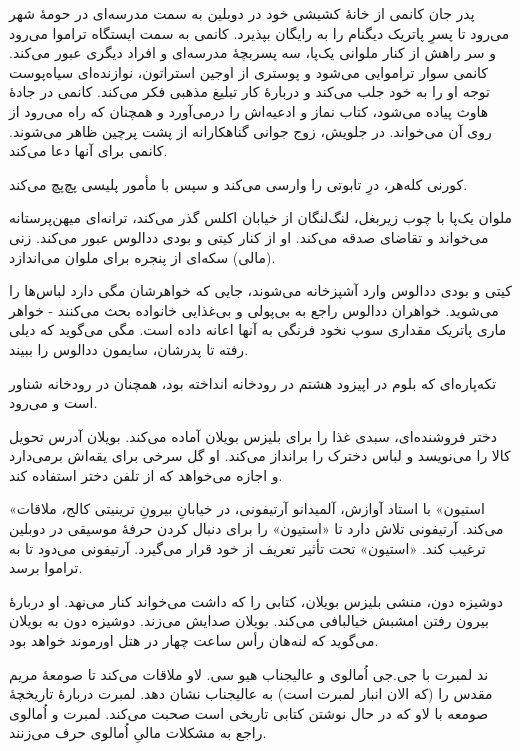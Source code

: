 \documentclass[12pt]{book}
\newcommand{\noun}[1]{«{#1}»}
\begin{document}
    پدر جان کانمی از خانۀ کشیشی خود در دوبلین به سمت مدرسه‌ای در حومۀ شهر می‌رود تا پسرِ پاتریک دیگنام را به رایگان بپذیرد. کانمی به سمت ایستگاه تراموا می‌رود و سر راهش از کنار ملوانی یک‌پا، سه پسربچۀ مدرسه‌ای و افراد دیگری عبور می‌کند. کانمی سوار تراموایی می‌شود و پوستری از اوجین استراتون، نوازنده‌ای سیاه‌پوست توجه او را به خود جلب می‌کند و دربارۀ کار تبلیغ مذهبی فکر می‌کند. کانمی در جادۀ هاوث پیاده می‌شود، کتاب نماز و ادعیه‌اش را درمی‌آورد و همچنان که راه می‌رود از روی آن می‌خواند. در جلویش، زوج جوانی گناهکارانه از پشت پرچین ظاهر می‌شوند. کانمی برای آنها دعا می‌کند.

    کورنی کله‌هر، درِ تابوتی را وارسی می‌کند و سپس با مأمور پلیسی پچ‌پچ می‌کند.

    ملوان یک‌پا با چوب زیربغل، لنگ‌لنگان از خیابان اکلس گذر می‌کند، ترانه‌ای میهن‌پرستانه می‌خواند و تقاضای صدقه می‌کند. او از کنار کیتی و بودی ددالوس عبور می‌کند. زنی (مالی) سکه‌ای از پنجره برای ملوان می‌اندازد.

    کیتی و بودی ددالوس وارد آشپزخانه می‌شوند، جایی که خواهرشان مگی دارد لباس‌ها را می‌شوید. خواهران ددالوس راجع به بی‌پولی و بی‌غذایی خانواده بحث می‌کنند - خواهر ماری پاتریک مقداری سوپ نخود فرنگی به آنها اعانه داده است. مگی می‌گوید که دیلی رفته تا پدرشان، سایمون ددالوس را ببیند.

    تکه‌پاره‌ای که بلوم در اپیزود هشتم در رودخانه انداخته بود، همچنان در رودخانه شناور است و می‌رود.

    دختر فروشنده‌ای، سبدی غذا را برای بلیزس بویلان آماده می‌کند. بویلان آدرس تحویل کالا را می‌نویسد و لباس دخترک را برانداز می‌کند. او گل سرخی برای یقه‌اش برمی‌دارد و اجازه می‌خواهد که از تلفن دختر استفاده کند.

    \noun{استیون} با استاد آوازش، آلمیدانو آرتیفونی، در خیابانِ بیرونِ ترینیتی کالج، ملاقات می‌کند. آرتیفونی تلاش دارد تا \noun{استیون} را برای دنبال کردن حرفۀ موسیقی در دوبلین ترغیب کند. \noun{استیون} تحت تأثیر تعریف از خود قرار می‌گیرد. آرتیفونی می‌دود تا به تراموا برسد.

    دوشیزه دون، منشی بلیزس بویلان، کتابی را که داشت می‌خواند کنار می‌نهد. او دربارۀ بیرون رفتن امشبش خیالبافی می‌کند. بویلان صدایش می‌زند. دوشیزه دون به بویلان می‌گوید که لنه‌هان رأس ساعت چهار در هتل اورموند خواهد بود.

    ند لمبرت با جی.جی اُمالوی و عالیجناب هیو سی. لاو ملاقات می‌کند تا صومعۀ مریم مقدس را (که الان انبار لمبرت است) به عالیجناب نشان دهد. لمبرت دربارۀ تاریخچۀ صومعه با لاو که در حال نوشتن کتابی تاریخی است صحبت می‌کند. لمبرت و اُمالوی راجع به مشکلات مالیِ اُمالوی حرف می‌زنند.
\end{document}
